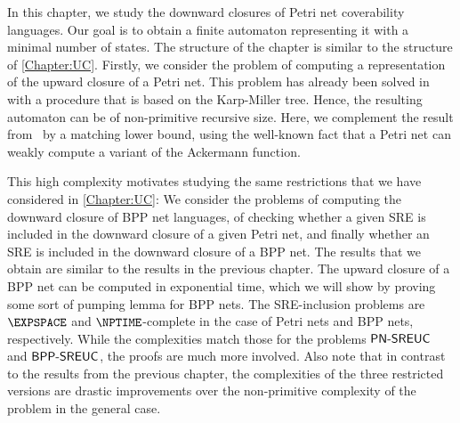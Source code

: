 \documentclass[../../diss.tex]{subfiles}
\begin{document}
In this chapter, we study the downward closures of Petri net coverability languages.
Our goal is to obtain a finite automaton representing it with a minimal number of states.
The structure of the chapter is similar to the structure of \cref{Chapter:UC}.
Firstly, we consider the problem of computing a representation of the upward closure of a Petri net.
This problem has already been solved in~\cite{HabermehlMW10} with a procedure that is based on the Karp-Miller tree.
Hence, the resulting automaton can be of non-primitive recursive size.
Here, we complement the result from~\cite{HabermehlMW10} by a matching lower bound, using the well-known fact that a Petri net can weakly compute a variant of the Ackermann function.

This high complexity motivates studying the same restrictions that we have considered in \cref{Chapter:UC}:
We consider the problems of computing the downward closure of BPP net languages, of checking whether a given SRE is included in the downward closure of a given Petri net, and finally whether an SRE is included in the downward closure of a BPP net.
The results that we obtain are similar to the results in the previous chapter.
The upward closure of a BPP net can be computed in exponential time, which we will show by proving some sort of pumping lemma for BPP nets.
%
The SRE-inclusion problems are $\EXPSPACE$ and $\NPTIME$-complete in the case of Petri nets and BPP nets, respectively.
While the complexities match those for the problems $\mathsf{PN\text{-}SREUC}$ and $\mathsf{BPP\text{-}SREUC}$, the proofs are much more involved.
%
Also note that in contrast to the results from the previous chapter, the complexities of the three restricted versions are drastic improvements over the non-primitive complexity of the problem in the general case.
\end{document}
